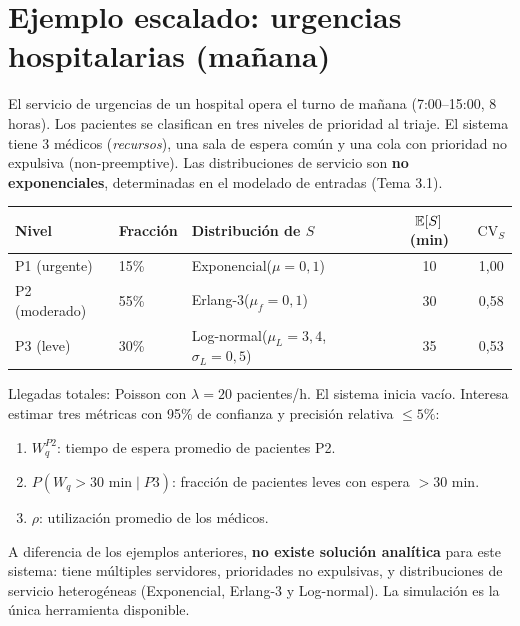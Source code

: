 \documentclass[11pt, letterpaper]{article}
\begin{document}
\section{Ejemplo escalado: urgencias hospitalarias (mañana)}

\begin{ejemplobox}[Sistema]
El servicio de urgencias de un hospital opera el turno de mañana (7:00--15:00, 8 horas). Los pacientes se clasifican en tres niveles de prioridad al triaje. El sistema tiene 3 médicos (\emph{recursos}), una sala de espera común y una cola con prioridad no expulsiva (non-preemptive). Las distribuciones de servicio son \textbf{no exponenciales}, determinadas en el modelado de entradas (Tema 3.1).

\medskip
\begin{center}\small
\renewcommand{\arraystretch}{1.3}
\begin{tabular}{lllcc}
\toprule
\textbf{Nivel} & \textbf{Fracción} & \textbf{Distribución de $S$} & $\mathbb{E}[S]$ (min) & $\text{CV}_S$ \\
\midrule
P1 (urgente)       & 15\% & Exponencial($\mu=0{,}1$)          & 10 & 1{,}00 \\
P2 (moderado)      & 55\% & Erlang-3($\mu_f=0{,}1$)           & 30 & 0{,}58 \\
P3 (leve)          & 30\% & Log-normal($\mu_L=3{,}4$, $\sigma_L=0{,}5$) & 35 & 0{,}53 \\
\bottomrule
\end{tabular}
\end{center}

\medskip
Llegadas totales: Poisson con $\lambda=20$ pacientes/h. El sistema inicia vacío. Interesa estimar tres métricas con 95\% de confianza y precisión relativa $\le 5\%$:
\begin{enumerate}
    \item $W_q^{P2}$: tiempo de espera promedio de pacientes P2.
    \item $P(W_q > 30\text{ min} \mid P3)$: fracción de pacientes leves con espera $>30$ min.
    \item $\rho$: utilización promedio de los médicos.
\end{enumerate}
\end{ejemplobox}

A diferencia de los ejemplos anteriores, \textbf{no existe solución analítica} para este sistema: tiene múltiples servidores, prioridades no expulsivas, y distribuciones de servicio heterogéneas (Exponencial, Erlang-3 y Log-normal). La simulación es la única herramienta disponible.
\end{document}
